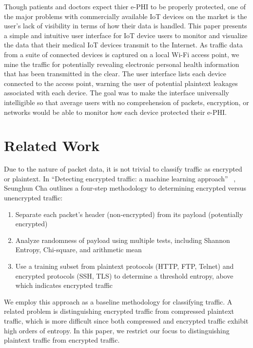 Though patients and doctors expect thier e-PHI to be properly protected, one of the major problems with commercially available IoT devices on the market is the user's lack of visibility in terms of how their data is handled. This paper presents a simple and intuitive user interface for IoT device users to monitor and visualize the data that their medical IoT devices transmit to the Internet. As traffic data from a suite of connected devices is captured on a local Wi-Fi access point, we mine the traffic for potentially revealing electronic personal health information that has been transmitted in the clear. The user interface lists each device connected to the access point, warning the user of potential plaintext leakages associated with each device. The goal was to make the interface universally intelligible so that average users with no comprehension of packets, encryption, or networks would be able to monitor how each device protected their e-PHI.

\section{Related Work}
Due to the nature of packet data, it is not trivial to classify traffic as encrypted or plaintext. In ``Detecting encrypted traffic: a machine learning approach'' ~\cite{chaMachineLearning}, Seunghun Cha outlines a four-step methodology to determining encrypted versus unencrypted traffic:

\begin{enumerate}
  \item Separate each packet's header (non-encrypted) from its payload (potentially encrypted)
  \item Analyze randomness of payload using multiple tests, including Shannon Entropy, Chi-square, and arithmetic mean
  \item Use a training subset from plaintext protocols (HTTP, FTP, Telnet) and encrypted protocols (SSH, TLS) to determine a threshold entropy, above which indicates encrypted traffic
\end{enumerate}

We employ this approach as a baseline methodology for classifying traffic. A related problem is distinguishing encrypted traffic from compressed plaintext traffic, which is more difficult since both compressed and encrypted traffic exhibit high orders of entropy. In this paper, we restrict our focus to distinguishing plaintext traffic from encrypted traffic.  

